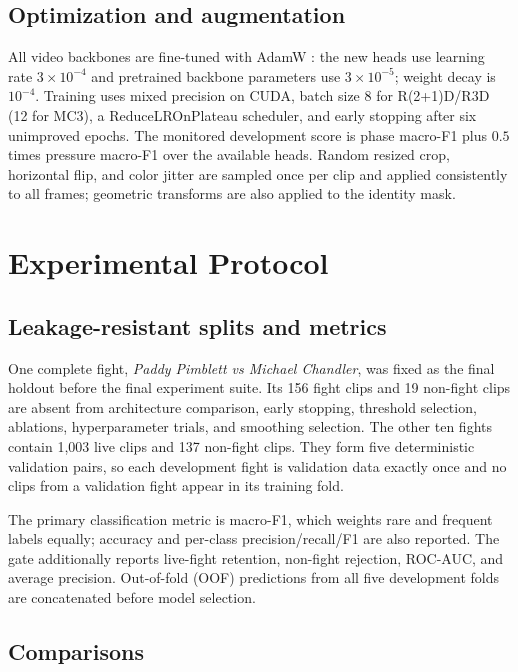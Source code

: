 \documentclass[10pt,twocolumn]{article}
\newcommand{\macroF}{macro-F1}
\newcommand{\Rtwo}{R(2+1)D}
\begin{document}
\subsection{Optimization and augmentation}

All video backbones are fine-tuned with AdamW \cite{loshchilov2019adamw}: the new heads use learning rate $3\times10^{-4}$ and pretrained backbone parameters use $3\times10^{-5}$; weight decay is $10^{-4}$. Training uses mixed precision on CUDA, batch size 8 for \Rtwo/R3D (12 for MC3), a ReduceLROnPlateau scheduler, and early stopping after six unimproved epochs. The monitored development score is phase \macroF{} plus $0.5$ times pressure \macroF{} over the available heads. Random resized crop, horizontal flip, and color jitter are sampled once per clip and applied consistently to all frames; geometric transforms are also applied to the identity mask.

\section{Experimental Protocol}

\subsection{Leakage-resistant splits and metrics}

One complete fight, \emph{Paddy Pimblett vs Michael Chandler}, was fixed as the final holdout before the final experiment suite. Its 156 fight clips and 19 non-fight clips are absent from architecture comparison, early stopping, threshold selection, ablations, hyperparameter trials, and smoothing selection. The other ten fights contain 1,003 live clips and 137 non-fight clips. They form five deterministic validation pairs, so each development fight is validation data exactly once and no clips from a validation fight appear in its training fold.

The primary classification metric is \macroF{}, which weights rare and frequent labels equally; accuracy and per-class precision/recall/F1 are also reported. The gate additionally reports live-fight retention, non-fight rejection, ROC-AUC, and average precision. Out-of-fold (OOF) predictions from all five development folds are concatenated before model selection.

\subsection{Comparisons}
\end{document}
